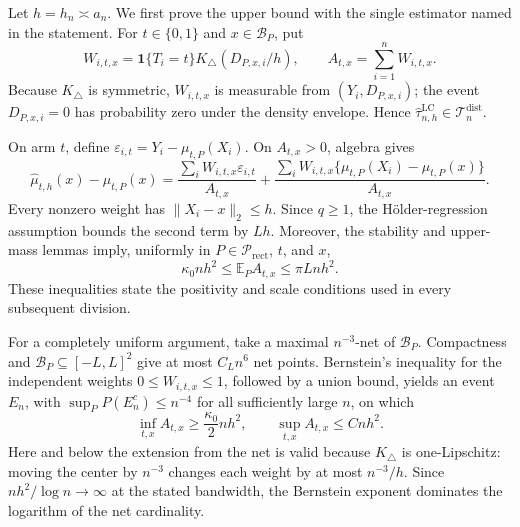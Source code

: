 Let \(h=h_n\asymp a_n\).  We first prove the upper bound with the single estimator named in the statement.  For \(t\in\{0,1\}\) and \(x\in\mathcal B_P\), put
\[
 W_{i,t,x}=\mathbf 1\{T_i=t\}K_\triangle(D_{P,x,i}/h),
 \qquad A_{t,x}=\sum_{i=1}^n W_{i,t,x}.
\]
Because \(K_\triangle\) is symmetric, \(W_{i,t,x}\) is measurable from \((Y_i,D_{P,x,i})\); the event \(D_{P,x,i}=0\) has probability zero under the density envelope.  Hence \(\widehat\tau^{\mathrm{LC}}_{n,h}\in\mathcal T_n^{\mathrm{dist}}\).

On arm \(t\), define \(\varepsilon_{i,t}=Y_i-\mu_{t,P}(X_i)\).  On \(A_{t,x}>0\), algebra gives
\[
 \widehat\mu_{t,h}(x)-\mu_{t,P}(x)
 =\frac{\sum_iW_{i,t,x}\varepsilon_{i,t}}{A_{t,x}}
 +\frac{\sum_iW_{i,t,x}\{\mu_{t,P}(X_i)-\mu_{t,P}(x)\}}{A_{t,x}}.
\]
Every nonzero weight has \(\lVert X_i-x\rVert_2\leq h\).  Since \(q\geq1\), the H\"older-regression assumption bounds the second term by \(Lh\).  Moreover, the stability and upper-mass lemmas imply, uniformly in \(P\in\mathcal P_{\mathrm{rect}}\), \(t\), and \(x\),
\[
 \kappa_0nh^2\leq \mathbb E_PA_{t,x}\leq \pi Lnh^2.
\]
These inequalities state the positivity and scale conditions used in every subsequent division.

For a completely uniform argument, take a maximal \(n^{-3}\)-net of \(\mathcal B_P\).  Compactness and \(\mathcal B_P\subseteq[-L,L]^2\) give at most \(C_Ln^6\) net points.  Bernstein's inequality for the independent weights \(0\leq W_{i,t,x}\leq1\), followed by a union bound, yields an event \(E_n\), with \(\sup_P P(E_n^c)\leq n^{-4}\) for all sufficiently large \(n\), on which
\[
 \inf_{t,x}A_{t,x}\geq\frac{\kappa_0}{2}nh^2,
 \qquad
 \sup_{t,x}A_{t,x}\leq Cnh^2.
\]
Here and below the extension from the net is valid because \(K_\triangle\) is one-Lipschitz: moving the center by \(n^{-3}\) changes each weight by at most \(n^{-3}/h\).  Since \(nh^2/\log n\to\infty\) at the stated bandwidth, the Bernstein exponent dominates the logarithm of the net cardinality.

